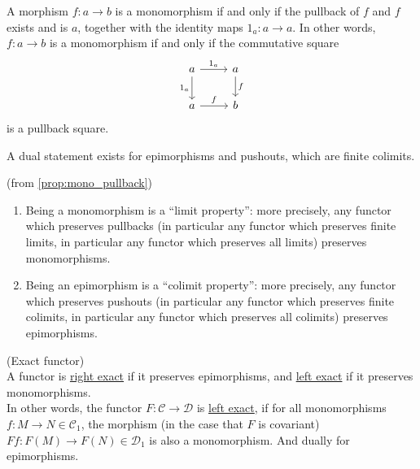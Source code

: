 \begin{lemma}\label{prop:mono_pullback}
A morphism $f : a \rightarrow b$ is a monomorphism if and only if
the pullback of $f$ and $f$ exists and is $a$, together with the identity maps $1_{a} : a \rightarrow a$.
In other words, $f : a \rightarrow b$ is a monomorphism if and only if the commutative square
\[
\begin{tikzcd}
a \arrow[r, "1_{a}"] \arrow[d, "1_{a}"'] & a \arrow[d, "f"] \\
a \arrow[r, "f"]                         & b               
\end{tikzcd}
\]
is a pullback square.

A dual statement exists for epimorphisms and pushouts, which are finite colimits.
\end{lemma}

\begin{corollary}{(from \ref{prop:mono_pullback})}\label{cor:preserve_mono_epi}

\begin{enumerate}
\item Being a monomorphism is a “limit property”: more precisely, any functor which preserves pullbacks
(in particular any functor which preserves finite limits, in particular any functor which preserves all limits)
preserves monomorphisms.
\item Being an epimorphism is a “colimit property”: more precisely, any functor which preserves pushouts
(in particular any functor which preserves finite colimits, in particular any functor which preserves all colimits)
preserves epimorphisms.
\end{enumerate}
\end{corollary}

\begin{definition}{(Exact functor)}\label{def:exact_functor_epi_mono}\\
A functor is \ul{right exact} if it preserves epimorphisms, and \ul{left exact} if it preserves monomorphisms.\\
\noindent In other words, the functor $F : \mathcal{C} \rightarrow \mathcal{D}$ is \ul{left exact}, if
for all monomorphisms $f : M \rightarrow N \in \mathcal{C}_{1}$, the morphism (in the case that $F$ is covariant)
$Ff : F(M) \rightarrow F(N) \in \mathcal{D}_{1}$ is also a monomorphism. And dually for epimorphisms.
\end{definition}

